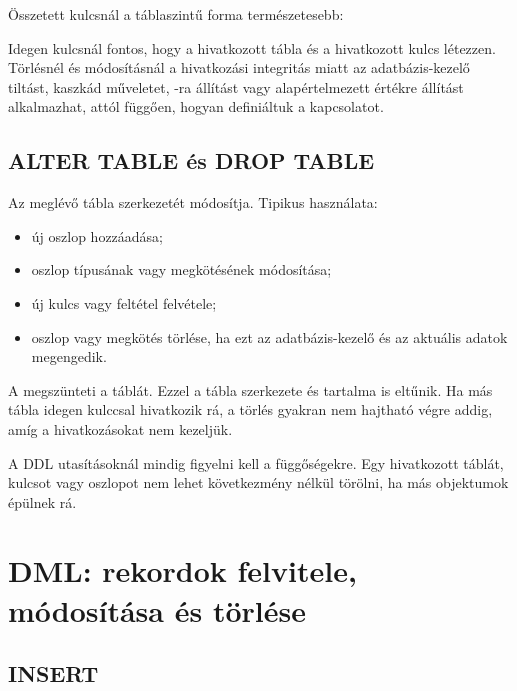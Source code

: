 Összetett kulcsnál a táblaszintű forma természetesebb:

\begin{center}
\end{center}

Idegen kulcsnál fontos, hogy a hivatkozott tábla és a hivatkozott kulcs létezzen. Törlésnél és módosításnál a hivatkozási integritás miatt az adatbázis-kezelő tiltást, kaszkád műveletet, -ra állítást vagy alapértelmezett értékre állítást alkalmazhat, attól függően, hogyan definiáltuk a kapcsolatot.

\subsection{ALTER TABLE és DROP TABLE}

Az  meglévő tábla szerkezetét módosítja. Tipikus használata:

\begin{itemize}
  \item új oszlop hozzáadása;
  \item oszlop típusának vagy megkötésének módosítása;
  \item új kulcs vagy  feltétel felvétele;
  \item oszlop vagy megkötés törlése, ha ezt az adatbázis-kezelő és az aktuális adatok megengedik.
\end{itemize}

A  megszünteti a táblát. Ezzel a tábla szerkezete és tartalma is eltűnik. Ha más tábla idegen kulccsal hivatkozik rá, a törlés gyakran nem hajtható végre addig, amíg a hivatkozásokat nem kezeljük.

\begin{warningbox}
A DDL utasításoknál mindig figyelni kell a függőségekre. Egy hivatkozott táblát, kulcsot vagy oszlopot nem lehet következmény nélkül törölni, ha más objektumok épülnek rá.
\end{warningbox}

\section{DML: rekordok felvitele, módosítása és törlése}

\subsection{INSERT}

